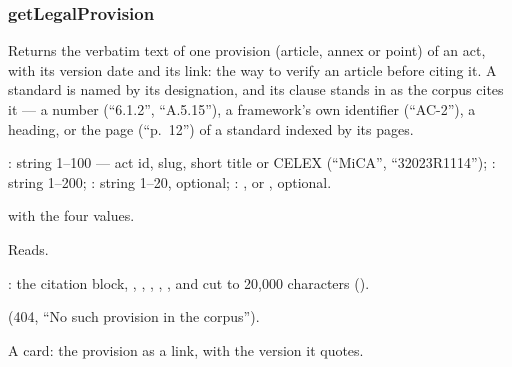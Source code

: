 \subsubsection{getLegalProvision}\label{sec:tools:getLegalProvision}
\begin{description}[style=multiline, leftmargin=19mm, labelwidth=17mm, labelsep=2mm,
  font=\sffamily\bfseries\footnotesize\color{ink}, itemsep=1pt, topsep=2pt, before=\raggedright]
  \item[Does] Returns the verbatim text of one provision (article, annex or point) of an act,
    with its version date and its link: the way to verify an article before citing it. A
    standard is named by its designation, and its clause stands in  as the corpus
    cites it --- a number (\enquote{6.1.2}, \enquote{A.5.15}), a framework's own identifier
    (\enquote{AC-2}), a heading, or the page (\enquote{p.~12}) of a standard indexed by its
    pages.
  \item[Input] : string 1--100 --- act id, slug, short title or CELEX
    (\enquote{MiCA}, \enquote{32023R1114}); : string 1--200;
    : string 1--20, optional; : ,  or
    , optional.
  \item[Calls]  with the four values.
  \item[Kind] Reads.
  \item[Returns] : the citation block, , ,
    , , , and  cut to 20,000
    characters ().
  \item[Errors]  (404, \enquote{No such provision in the corpus}).
  \item[Console] A card: the provision as a link, with the version it quotes.
\end{description}

